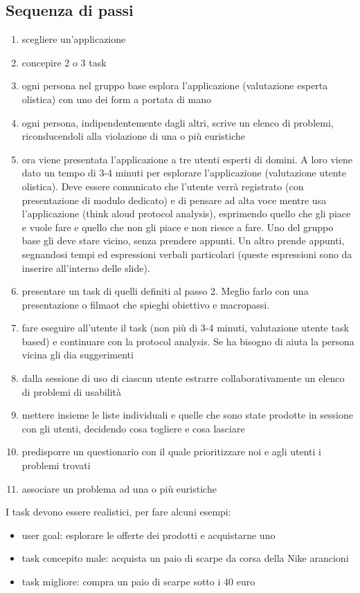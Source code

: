 \documentclass[11pt,a4paper]{book}
\begin{document}
\subsection{Sequenza di passi}
\begin{enumerate}
	\item scegliere un'applicazione
	\item concepire 2 o 3 task
	\item ogni persona nel gruppo base esplora l'applicazione (valutazione esperta olistica) con uno dei form a portata di mano
	\item ogni persona, indipendentemente dagli altri, scrive un elenco di problemi, riconducendoli alla violazione di una o più euristiche
	\item ora viene presentata l'applicazione a tre utenti esperti di domini. A loro viene dato un tempo di 3-4 minuti per esplorare l'applicazione (valutazione utente olistica). Deve essere comunicato che l'utente verrà registrato (con presentazione di modulo dedicato) e di pensare ad alta voce mentre usa l'applicazione (think aloud protocol analysis), esprimendo quello che gli piace e vuole fare e quello che non gli piace e non riesce a fare. Uno del gruppo base gli deve stare vicino, senza prendere appunti. Un altro prende appunti, segnandosi tempi ed espressioni verbali particolari (queste espressioni sono da inserire all'interno delle slide).
	\item presentare un task di quelli definiti al passo 2. Meglio farlo con una presentazione o filmaot che spieghi obiettivo e macropassi.
	\item fare eseguire all'utente il task (non più di 3-4 minuti, valutazione utente task based) e continuare con la protocol analysis. Se ha bisogno di aiuta la persona vicina gli dia suggerimenti
	\item dalla sessione di uso di ciascun utente estrarre collaborativamente un elenco di problemi di usabilità
	\item mettere insieme le liste individuali e quelle che sono state prodotte in sessione con gli utenti, decidendo cosa togliere e cosa lasciare
	\item predisporre un questionario con il quale prioritizzare noi e agli utenti i problemi trovati
	\item associare un problema ad una o più euristiche
\end{enumerate}

I task devono essere realistici, per fare alcuni esempi:
\begin{itemize}
	\item user goal: esplorare le offerte dei prodotti e acquistarne uno
	\item task concepito male: acquista un paio di scarpe da corsa della Nike arancioni
	\item task migliore: compra un paio di scarpe sotto i 40 euro
\end{itemize}
\end{document}
